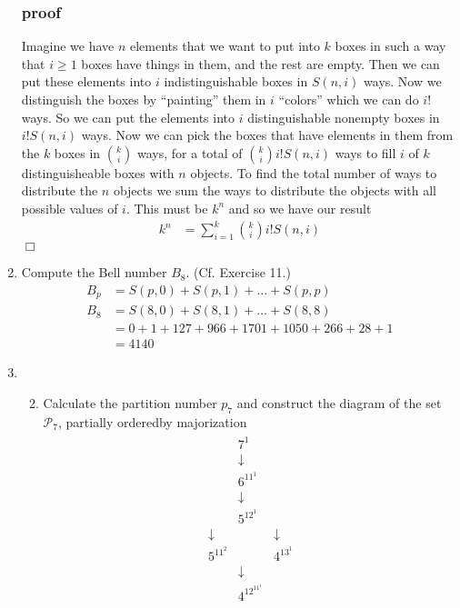\documentclass{article}
\begin{document}
\begin{enumerate}
  \subsubsection*{proof}
  Imagine we have $n$ elements that we want to put into $k$ boxes in such a way that $i\ge1$ boxes have things in them, and the rest are empty. Then we can put these elements into $i$ indistinguishable boxes in $S(n,i)$ ways. Now we distinguish the boxes by ``painting'' them in $i$ ``colors'' which we can do $i!$ ways. So we can put the elements into $i$ distinguishable nonempty boxes in $i!S(n,i)$ ways. Now we can pick the boxes that have elements in them from the $k$ boxes in $\binom{k}{i}$ ways, for a total of $\binom{k}{i}i!S(n,i)$ ways to fill $i$ of $k$ distinguisheable boxes with $n$ objects. To find the total number of ways to distribute the $n$ objects we sum the ways to distribute the objects with all possible values of $i$. This must be $k^n$ and so we have our result
  \begin{align*}
    k^n&=\sum\limits_{i=1}^k{\binom{k}{i}i!S(n,i)}
  \end{align*}
  $\Box$
  \item
  Compute the Bell number $B_8$. (Cf. Exercise 11.)
  \begin{align*}
    B_p&=S(p,0)+S(p,1)+\dots+S(p,p)\\
    B_8&=S(8,0)+S(8,1)+\dots+S(8,8)\\
    &=0+1+127+966+1701+1050+266+28+1\\
    &=4140
  \end{align*}
  \setcounter{enumi}{21}
  \item
  \begin{enumerate}
    \setcounter{enumii}{1}
    \item
    Calculate the partition number $p_7$ and construct the diagram of the set $\mathcal{P}_7$, partially orderedby majorization
    \begin{align*}
      \begin{matrix}
      &7^1\\
      &\downarrow\\
      &6^11^1\\
      &\downarrow\\
      &5^12^1\\
      \downarrow&&\downarrow\\
      5^11^2&&4^13^1\\
      &\downarrow\\
      &4^12^11^1\\

\end{matrix}
\end{align*}
\end{enumerate}
\end{enumerate}
\end{document}
